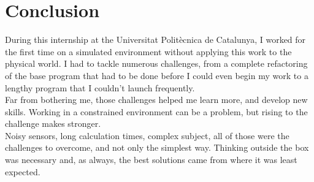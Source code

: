 \chapter{Conclusion}

\label{conclusion}

During this internship at the Universitat Politècnica de Catalunya, I worked for the first time on a simulated environment without applying this work to the physical world.
I had to tackle numerous challenges, from a complete refactoring of the base program that had to be done before I could even begin my work to a lengthy program that I couldn't launch frequently.\\

Far from bothering me, those challenges helped me learn more, and develop new skills. Working in a constrained environment can be a problem, but rising to the challenge makes stronger.\\

Noisy sensors, long calculation times, complex subject, all of those were the challenges to overcome, and not only the simplest way.
Thinking outside the box was necessary and, as always, the best solutions came from where it was least expected.
